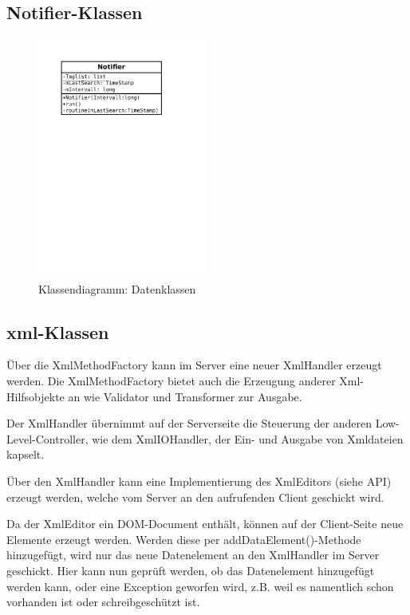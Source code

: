 \subsection{Notifier-Klassen}
\liable{\sab}

\begin{figure}[H]
	\centering
	\label{dia:design:frontend:classes:notifier}
	\includegraphics[width=0.5\textwidth]{design/frontend/classes/NotifyClass.pdf}
	\caption{Klassendiagramm: Datenklassen}
\end{figure}

\subsection{xml-Klassen}
Über die XmlMethodFactory kann im Server eine neuer XmlHandler erzeugt werden.
Die XmlMethodFactory bietet auch die Erzeugung anderer Xml-Hilfsobjekte an wie Validator und Transformer zur Ausgabe.

Der XmlHandler übernimmt auf der Serverseite die Steuerung der anderen Low-Level-Controller, wie dem
XmlIOHandler, der Ein- und Ausgabe von Xmldateien kapselt. 

Über den XmlHandler kann eine Implementierung des XmlEditors (siehe API) erzeugt werden, welche
vom Server an den aufrufenden Client geschickt wird.

Da der XmlEditor ein DOM-Document enthält, können auf der Client-Seite neue Elemente erzeugt werden.
Werden diese per addDataElement()-Methode hinzugefügt, wird nur das neue Datenelement an den
XmlHandler im Server geschickt. Hier kann nun geprüft werden, ob das Datenelement hinzugefügt
werden kann, oder eine Exception geworfen wird, z.B. weil es namentlich schon vorhanden ist oder
schreibgeschützt ist. 

